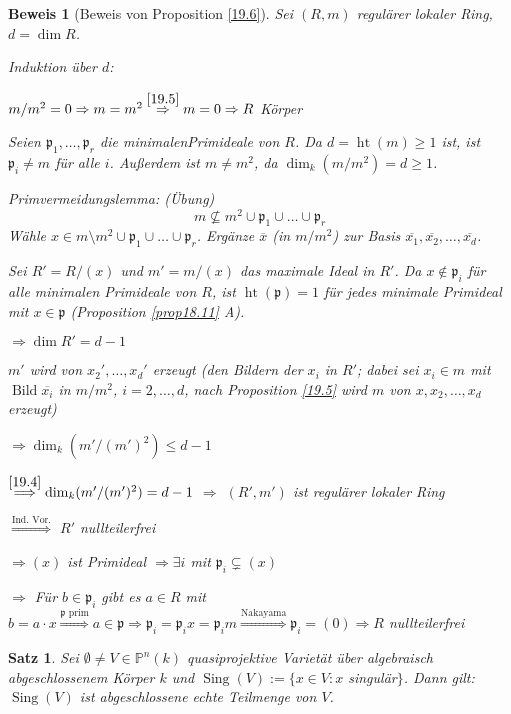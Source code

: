 \documentclass[a4paper, 12pt, numbers=noendperiod, chapterprefix=true, headsepline]{scrbook}
\theoremstyle{break}
\newtheorem{Satz}{Satz}
\theoremstyle{nonumberbreak}
\newtheorem{Bew}{Beweis}
\theoremstyle{nonumberplain}
\DeclareMathOperator{\Bild}{Bild}
\DeclareMathOperator{\Sing}{Sing}
\DeclareMathOperator{\Ht}{ht}
\newcommand{\IP}{\mathbb{P}}%
\newcommand{\frakp}{\mathfrak{p}}
\begin{document}
\begin{Bew}[Beweis von Proposition \ref{19.6}]
Sei $(R,m)$ regul\"arer lokaler Ring, $d=\dim R$.

\emph{Induktion \"uber $d$:}\begin{description}[\setlabelstyle{\normalfont}]
\item[$d=0$:]
	$m/m^2=0\Rightarrow m=m^2 \overset{\ref{19.5}}{\Rightarrow} m=0 \Rightarrow R$ K\"orper
\item[$d\ge1$:]
	Seien $\frakp_1,\ldots ,\frakp_r$ die minimalenPrimideale von $R$. Da $d=\Ht(m)\ge1$ ist, ist $\frakp_i\ne m$ f\"ur alle $i$. Au\ss erdem ist $m\ne m^2$, da $\dim_k(m/m^2)=d\ge1$.
	
	\emph{Primvermeidungslemma:} (\"Ubung)
		\[m\nsubseteq m^2 \cup \frakp_1\cup\ldots \cup \frakp_r\]
	W\"ahle $x\in m\setminus m^2 \cup \frakp_1 \cup \ldots \cup \frakp_r$. Erg\"anze $\overline{x}$ (in $m/m^2$) zur Basis $\overline{x_1}, \overline{x_2},\ldots ,\overline{x_d}$.
	
	Sei $R'=R/(x)$ und $m'=m/(x)$ das maximale Ideal in $R'$. Da $x\notin \frakp_i$ f\"ur alle minimalen Primideale von $R$, ist $\Ht(\frakp)=1$ f\"ur jedes minimale Primideal mit $x\in \frakp$ (Proposition \ref{prop18.11} A).
	
	$\Rightarrow \dim R' = d-1$
	
	$m'$ wird von $x_2',\ldots ,x_d'$ erzeugt (den Bildern der $x_i$ in $R'$; dabei sei $x_i\in m$ mit $\Bild \overline{x_i}$ in $m/m^2$, $i=2,\ldots ,d$, nach Proposition \ref{19.5} wird $m$ von $x,x_2,\ldots ,x_d$ erzeugt)
	
	$\Rightarrow \dim_k(m'/(m')^2)\le d-1$
	
	$\overset{\ref{19.4}}{\Longrightarrow} \dim_k(m'/(m')^2)=d-1$ $\Rightarrow$ $(R',m')$ ist regul\"arer lokaler Ring
	
	$\overset{\text{Ind. Vor.}}{\Longrightarrow}$ $R'$ nullteilerfrei
	
	$\Rightarrow (x)$ ist Primideal $\Rightarrow \exists i$ mit $\frakp_i\subsetneq(x)$
	
	$\Rightarrow $ F\"ur $b\in \frakp_i$ gibt es $a\in R$ mit $b=a\cdot x \overset{\frakp \text{ prim}}{\Longrightarrow} a\in \frakp \Rightarrow \frakp_i = \frakp_ix= \frakp_im \overset{\text{Nakayama}}{\Longrightarrow} \frakp_i=(0) \Rightarrow R$ nullteilerfrei
\end{description}
\end{Bew}

\begin{Satz}
Sei $\emptyset\ne V\in \IP^n(k)$ quasiprojektive Variet\"at \"uber algebraisch abgeschlossenem K\"orper $k$ und $\Sing(V):=\{x\in V: x$ singul\"ar$\}$. Dann gilt: $\Sing(V)$ ist abgeschlossene echte Teilmenge von $V$.
\end{Satz}
\end{document}
